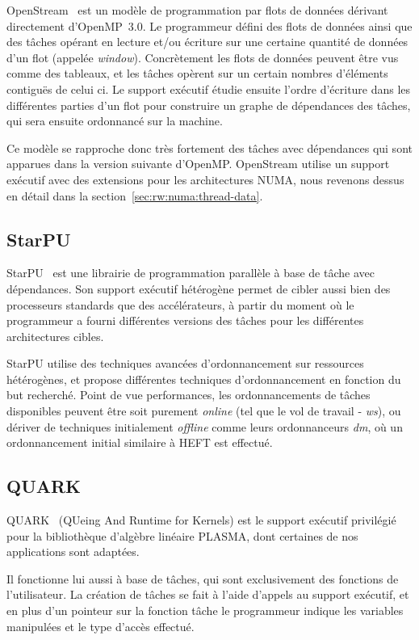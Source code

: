 OpenStream~\cite{Pop2013} est un modèle de programmation par flots de données dérivant directement d'OpenMP~3.0.
Le programmeur défini des flots de données ainsi que des tâches opérant en lecture et/ou écriture sur une certaine quantité de données d'un flot (appelée \emph{window}).
Concrètement les flots de données peuvent être vus comme des tableaux, et les tâches opèrent sur un certain nombres d'éléments contiguës de celui ci.
Le support exécutif étudie ensuite l'ordre d'écriture dans les différentes parties d'un flot pour construire un graphe de dépendances des tâches, qui sera ensuite ordonnancé sur la machine.

Ce modèle se rapproche donc très fortement des tâches avec dépendances qui sont apparues dans la version suivante d'OpenMP.
OpenStream utilise un support exécutif avec des extensions pour les architectures NUMA, nous revenons dessus en détail dans la section~\ref{sec:rw:numa:thread-data}.

\subsection{StarPU}

StarPU~\cite{StarPU} est une librairie de programmation parallèle à base de tâche avec dépendances.
Son support exécutif hétérogène permet de cibler aussi bien des processeurs standards que des accélérateurs, à partir du moment où le programmeur a fourni différentes versions des tâches pour les différentes architectures cibles.

StarPU utilise des techniques avancées d'ordonnancement sur ressources hétérogènes, et propose différentes techniques d'ordonnancement en fonction du but recherché.
Point de vue performances, les ordonnancements de tâches disponibles peuvent être soit purement \emph{online} (tel que le vol de travail - \emph{ws}), ou dériver de techniques initialement \emph{offline} comme leurs ordonnanceurs \emph{dm}, où un ordonnancement initial similaire à HEFT est effectué.

\subsection{QUARK}

QUARK~\cite{Kurzak2013} (QUeing And Runtime for Kernels) est le support exécutif privilégié pour la bibliothèque d'algèbre linéaire PLASMA, dont certaines de nos applications sont adaptées.

Il fonctionne lui aussi à base de tâches, qui sont exclusivement des fonctions de l'utilisateur.
La création de tâches se fait à l'aide d'appels au support exécutif, et en plus d'un pointeur sur la fonction tâche le programmeur indique les variables manipulées et le type d'accès effectué.

